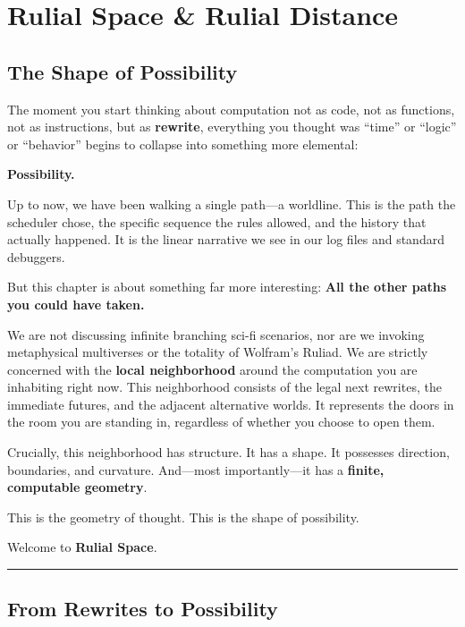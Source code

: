 \chapter{Rulial Space \& Rulial Distance}
\label{chapter-5-rulial-space-rulial-distance}

\section{The Shape of Possibility}
\label{the-shape-of-possibility}

The moment you start thinking about computation not as code, not as functions, not as instructions, but as \textbf{rewrite}, everything you thought was ``time'' or ``logic'' or ``behavior'' begins to collapse into something more elemental:

\textbf{Possibility.}

Up to now, we have been walking a single path—a worldline. This is the path the scheduler chose, the specific sequence the rules allowed, and the history that actually happened. It is the linear narrative we see in our log files and standard debuggers.

But this chapter is about something far more interesting: \textbf{All the other paths you could have taken.}

We are not discussing infinite branching sci-fi scenarios, nor are we invoking metaphysical multiverses or the totality of Wolfram's Ruliad. We are strictly concerned with the \textbf{local neighborhood} around the computation you are inhabiting right now. This neighborhood consists of the legal next rewrites, the immediate futures, and the adjacent alternative worlds. It represents the doors in the room you are standing in, regardless of whether you choose to open them.

Crucially, this neighborhood has structure. It has a shape. It possesses direction, boundaries, and curvature. And—most importantly—it has a \textbf{finite, computable geometry}.

This is the geometry of thought. This is the shape of possibility.

Welcome to \textbf{Rulial Space}.

\begin{center}
\rule{0.5\linewidth}{0.5pt}
\end{center}

\section{From Rewrites to Possibility}
\label{from-rewrites-to-possibility}

